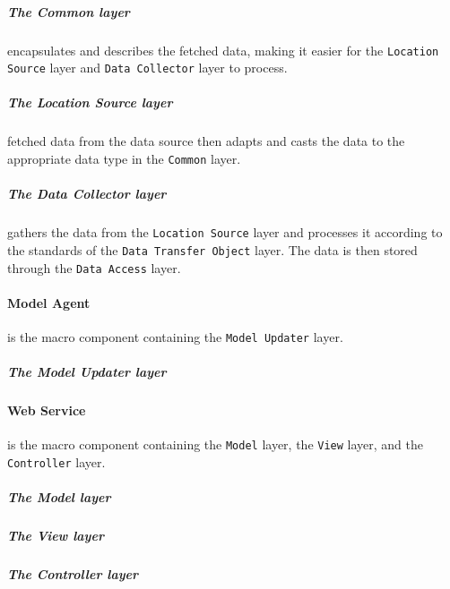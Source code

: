 \subparagraph{The Common layer} encapsulates and describes the fetched data, making it easier for the \texttt{Location Source} layer and \texttt{Data Collector} layer to process.

\subparagraph{The Location Source layer} fetched data from the data source then adapts and casts the data to the appropriate data type in the \texttt{Common} layer.

\subparagraph{The Data Collector layer} gathers the data from the \texttt{Location Source} layer and processes it according to the standards of the \texttt{Data Transfer Object} layer. The data is then stored through the \texttt{Data Access} layer.


\paragraph{Model Agent} is the macro component containing the \texttt{Model Updater} layer.

\subparagraph{The Model Updater layer}


\paragraph{Web Service}  is the macro component containing the \texttt{Model} layer, the \texttt{View} layer, and the \texttt{Controller} layer.

\subparagraph{The Model layer}

\subparagraph{The View layer}

\subparagraph{The Controller layer}